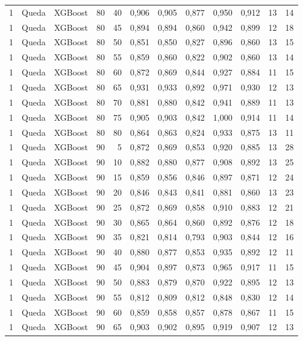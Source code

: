 \begin{longtable}{ccclrrrrrrrr}
1 & Queda & XGBoost & 80 & 40 & 0,906 & 0,905 & 0,877 & 0,950 & 0,912 & 13 & 14 \\
1 & Queda & XGBoost & 80 & 45 & 0,894 & 0,894 & 0,860 & 0,942 & 0,899 & 12 & 18 \\
1 & Queda & XGBoost & 80 & 50 & 0,851 & 0,850 & 0,827 & 0,896 & 0,860 & 13 & 15 \\
1 & Queda & XGBoost & 80 & 55 & 0,859 & 0,860 & 0,822 & 0,902 & 0,860 & 13 & 14 \\
1 & Queda & XGBoost & 80 & 60 & 0,872 & 0,869 & 0,844 & 0,927 & 0,884 & 11 & 15 \\
1 & Queda & XGBoost & 80 & 65 & 0,931 & 0,933 & 0,892 & 0,971 & 0,930 & 12 & 13 \\
1 & Queda & XGBoost & 80 & 70 & 0,881 & 0,880 & 0,842 & 0,941 & 0,889 & 11 & 13 \\
1 & Queda & XGBoost & 80 & 75 & 0,905 & 0,903 & 0,842 & 1,000 & 0,914 & 11 & 14 \\
1 & Queda & XGBoost & 80 & 80 & 0,864 & 0,863 & 0,824 & 0,933 & 0,875 & 13 & 11 \\
1 & Queda & XGBoost & 90 & 5 & 0,872 & 0,869 & 0,853 & 0,920 & 0,885 & 13 & 28 \\
1 & Queda & XGBoost & 90 & 10 & 0,882 & 0,880 & 0,877 & 0,908 & 0,892 & 13 & 25 \\
1 & Queda & XGBoost & 90 & 15 & 0,859 & 0,856 & 0,846 & 0,897 & 0,871 & 12 & 24 \\
1 & Queda & XGBoost & 90 & 20 & 0,846 & 0,843 & 0,841 & 0,881 & 0,860 & 13 & 23 \\
1 & Queda & XGBoost & 90 & 25 & 0,872 & 0,869 & 0,858 & 0,910 & 0,883 & 12 & 21 \\
1 & Queda & XGBoost & 90 & 30 & 0,865 & 0,864 & 0,860 & 0,892 & 0,876 & 12 & 18 \\
1 & Queda & XGBoost & 90 & 35 & 0,821 & 0,814 & 0,793 & 0,903 & 0,844 & 12 & 16 \\
1 & Queda & XGBoost & 90 & 40 & 0,880 & 0,877 & 0,853 & 0,935 & 0,892 & 12 & 11 \\
1 & Queda & XGBoost & 90 & 45 & 0,904 & 0,897 & 0,873 & 0,965 & 0,917 & 11 & 15 \\
1 & Queda & XGBoost & 90 & 50 & 0,883 & 0,879 & 0,870 & 0,922 & 0,895 & 12 & 13 \\
1 & Queda & XGBoost & 90 & 55 & 0,812 & 0,809 & 0,812 & 0,848 & 0,830 & 12 & 14 \\
1 & Queda & XGBoost & 90 & 60 & 0,859 & 0,858 & 0,857 & 0,878 & 0,867 & 11 & 15 \\
1 & Queda & XGBoost & 90 & 65 & 0,903 & 0,902 & 0,895 & 0,919 & 0,907 & 12 & 13 \\

\end{longtable}
